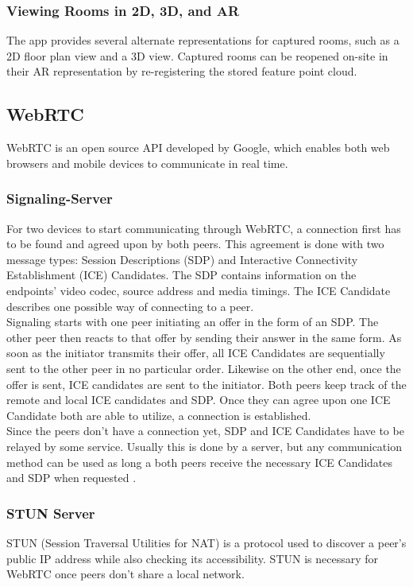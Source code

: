 \documentclass{article}
\begin{document}
\subsubsection{Viewing Rooms in 2D, 3D, and AR}
The app provides several alternate representations for captured rooms, such as a 2D floor plan view and a 3D view. Captured rooms can be reopened on-site in their AR representation by re-registering the stored feature point cloud.

\subsection{WebRTC}
WebRTC is an open source API developed by Google, which enables both web browsers and mobile devices to communicate in real time. 
\subsubsection{Signaling-Server}
For two devices to start communicating through WebRTC, a connection first has to be found and agreed upon by both peers. This agreement is done with two message types: Session Descriptions (SDP) and Interactive Connectivity Establishment (ICE) Candidates. The SDP contains information on the endpoints' video codec, source address and media timings. The ICE Candidate describes one possible way of connecting to a peer.\\
Signaling starts with one peer initiating an offer in the form of an SDP. The other peer then reacts to that offer by sending their answer in the same form. As soon as the initiator transmits their offer, all ICE Candidates are sequentially sent to the other peer in no particular order. Likewise on the other end, once the offer is sent, ICE candidates are sent to the initiator. Both peers keep track of the remote and local ICE candidates and SDP. Once they can agree upon one ICE Candidate both are able to utilize, a connection is established.\\
Since the peers don't have a connection yet, SDP and ICE Candidates have to be relayed by some service. Usually this is done by a server, but any communication method can be used as long a both peers receive the necessary ICE Candidates and SDP when requested \cite{mozilla_signaling_nodate}.
\subsubsection{STUN Server}
STUN (Session Traversal Utilities for NAT) is a protocol used to discover a peer's public IP address while also checking its accessibility. STUN is necessary for WebRTC once peers don't share a local network.
\end{document}
